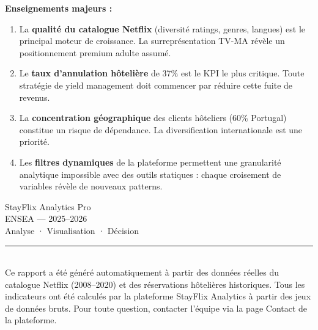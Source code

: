 \documentclass[12pt,a4paper]{article}
\begin{document}
\begin{insightbox}[purple]
  \textbf{Enseignements majeurs :}
  \begin{enumerate}
    \item La \textbf{qualité du catalogue Netflix} (diversité ratings, genres, langues) est le principal moteur de croissance. La surreprésentation TV-MA révèle un positionnement premium adulte assumé.
    \item Le \textbf{taux d'annulation hôtelière} de 37\% est le KPI le plus critique. Toute stratégie de yield management doit commencer par réduire cette fuite de revenus.
    \item La \textbf{concentration géographique} des clients hôteliers (60\% Portugal) constitue un risque de dépendance. La diversification internationale est une priorité.
    \item Les \textbf{filtres dynamiques} de la plateforme permettent une granularité analytique impossible avec des outils statiques : chaque croisement de variables révèle de nouveaux patterns.
  \end{enumerate}
\end{insightbox}

\vspace{1cm}

\begin{center}
  \begin{tcolorbox}[
    colback=darkbg,
    colframe=netflix,
    width=10cm,
    rounded corners,
    halign=center,
    fontupper=\color{white}\bfseries\Large,
    boxrule=2pt
  ]
    StayFlix Analytics Pro\\
    {\normalsize\color{white!70!gray} ENSEA — 2025--2026}\\
    {\small\color{netflix} Analyse · Visualisation · Décision}
  \end{tcolorbox}
\end{center}

\vspace{1cm}
\noindent\rule{\textwidth}{1pt}\\[0.3cm]
{\small\textcolor{textgray}{
  Ce rapport a été généré automatiquement à partir des données réelles du catalogue Netflix (2008--2020) et des réservations hôtelières historiques. Tous les indicateurs ont été calculés par la plateforme StayFlix Analytics à partir des jeux de données bruts. Pour toute question, contacter l'équipe via la page Contact de la plateforme.
}}
\end{document}
